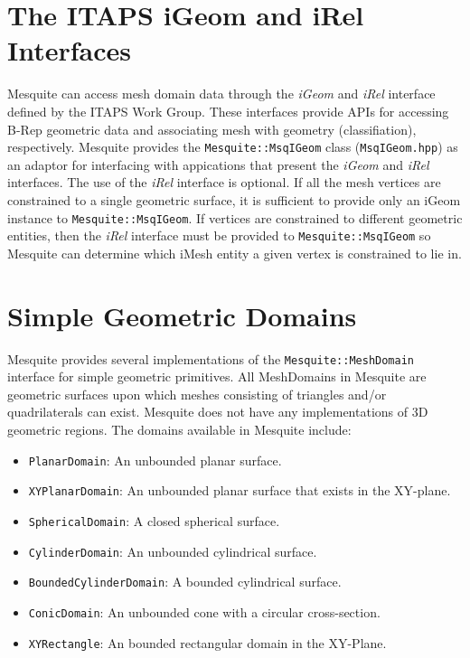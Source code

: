 \section{The ITAPS iGeom and iRel Interfaces} \label{sec:ITAPS}

Mesquite can access mesh domain data through the \emph{iGeom} and \emph{iRel} interface defined by the ITAPS Work Group.  These interfaces provide APIs for accessing B-Rep geometric data and associating mesh with geometry (classifiation), respectively.  Mesquite provides the \texttt{Mesquite::MsqIGeom} class (\texttt{MsqIGeom.hpp}) as an adaptor for interfacing with appications that present the \emph{iGeom} and \emph{iRel} interfaces.  The use of the \emph{iRel} interface is optional.  If all the mesh vertices are constrained to a single geometric surface, it is sufficient to provide only an iGeom instance to \texttt{Mesquite::MsqIGeom}.  If vertices are constrained to different geometric entities, then the \emph{iRel} interface must be provided to \texttt{Mesquite::MsqIGeom} so Mesquite can determine which iMesh entity a given vertex is constrained to lie in.


\section{Simple Geometric Domains} \label{sec:MsqGeom}

Mesquite provides several implementations of the
\texttt{Mesquite::MeshDomain} interface for simple geometric primitives. All MeshDomains in Mesquite are geometric surfaces upon which meshes consisting of triangles and/or quadrilaterals can exist. Mesquite does not have any implementations of 3D geometric regions. The domains available in Mesquite include:
\begin{itemize}
\item \texttt{PlanarDomain}: An unbounded planar surface.
\item \texttt{XYPlanarDomain}: An unbounded planar surface that exists in the XY-plane.
\item \texttt{SphericalDomain}: A closed spherical surface.
\item \texttt{CylinderDomain}: An unbounded cylindrical surface.
\item \texttt{BoundedCylinderDomain}: A bounded cylindrical surface.
\item \texttt{ConicDomain}: An unbounded cone with a circular cross-section.
\item \texttt{XYRectangle}: An bounded rectangular domain in the XY-Plane.
\end{itemize}

